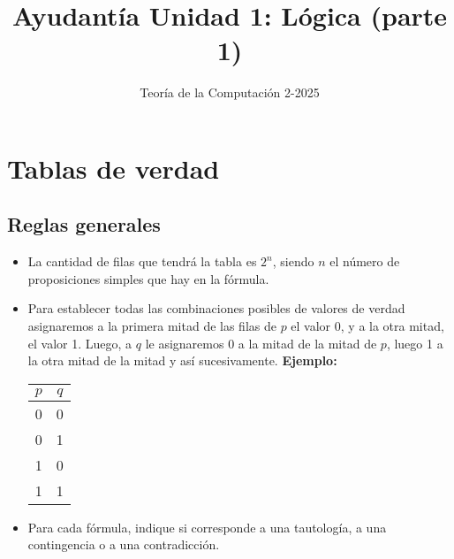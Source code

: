 \documentclass{article}
\begin{document}
\title{Ayudantía Unidad 1: Lógica (parte 1)}
\author{Teoría de la Computación 2-2025}
\date{}

\maketitle

\section{Tablas de verdad}

\subsection{Reglas generales}

\begin{itemize}
  \item La cantidad de filas que tendrá la tabla es $2^n$, siendo $n$ el número
        de proposiciones simples que hay en la fórmula.
  \item Para establecer todas las combinaciones posibles de valores de verdad
        asignaremos a la primera mitad de las filas de $p$ el valor 0, y a la
        otra mitad, el valor 1. Luego, a $q$ le asignaremos 0 a la mitad de la
        mitad de $p$, luego 1 a la otra mitad de la mitad y así sucesivamente.
        \textbf{Ejemplo:}
  \begin{table}[H]
    \centering
    \begin{tabular}{c|c}
      $p$ & $q$ \\
      \hline
      \hline
      0 & 0 \\
      0 & 1 \\
      1 & 0 \\
      1 & 1 \\
    \end{tabular}
  \end{table}
  \item Para cada fórmula, indique si corresponde a una tautología, a una
        contingencia o a una contradicción.
\end{itemize}
\end{document}
